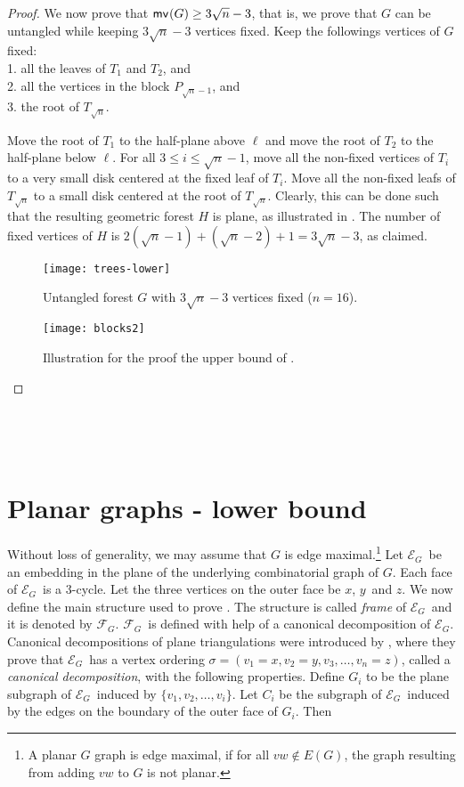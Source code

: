 \documentclass[lotsofwhite,charterfonts, letter]{patmorin}
\newcommand{\Figure}[4][htb]{
\begin{figure}[#1]
  \vspace*{1ex}
  \begin{center}#3\end{center}
	\vspace*{-2ex}
	\caption{\figlabel{#2}#4}
\end{figure}}
\newcommand{\mv}[2][]{\ensuremath{\textup{\textsf{mv}}_{#1}(#2)}}
\newcommand{\eg}{\ensuremath{\mathcal{E}_G}}
\newcommand{\fg}{\ensuremath{\mathcal{F}_G}}
\newcommand{\xx}{\ensuremath{x}}
\newcommand{\yy}{\ensuremath{y}}
\newcommand{\zz}{\ensuremath{z}}
\begin{document}
\begin{proof}



 
%


We now prove that $\mv{G}\geq 3\sqrt{n}-3$, that is, we prove that $G$ can be untangled while keeping $3\sqrt{n}-3$ vertices fixed. Keep the followings vertices of $G$ fixed:\\
1. all the leaves of $T_1$ and $T_2$, and\\
2. all the vertices in the block $P_{\sqrt{n}-1}$, and\\
3. the root of $T_{\sqrt{n}}$.

Move the root of $T_1$ to the half-plane above $\ell$ and move the root of $T_2$ to the half-plane below $\ell$. For all $3 \leq i\leq \sqrt{n}-1$, move all the non-fixed vertices of $T_i$ to a very small disk centered at the fixed leaf of $T_i$. Move all the non-fixed leafs of $T_{\sqrt{n}}$ to a small disk centered at the root of $T_{\sqrt{n}}$. Clearly, this can be done such that the resulting geometric forest $H$ is plane, as illustrated in . The number of fixed vertices of $H$ is 
$ 2(\sqrt{n}-1) + (\sqrt{n}-2) +1 = 3\sqrt{n} -3$, as claimed.

\Figure{trees-lower}{\texttt{[image: trees-lower]}
}{Untangled forest $G$ with $3\sqrt{n}-3$ vertices fixed ($n=16$).}


\Figure{blocks2}{\texttt{[image: blocks2]}
}{Illustration for the proof the upper bound of \thmref{trees-lb}.}

\end{proof}



~\newpage

~\newpage

\section{Planar graphs - lower bound}

Without loss of generality, we may assume that $G$ is edge
maximal.\footnote{A planar $G$ graph is edge maximal, if for all
$vw\not\in E(G)$, the graph resulting from adding $vw$ to $G$ is not
planar.} Let \eg\ be an embedding in the plane of the underlying
combinatorial graph of $G$. Each face of \eg\ is a $3$-cycle. Let the
three vertices on the outer face be \xx, \yy\ and \zz.  We now define
the main structure used to prove . The structure is
called \emph{frame} of \eg\ and it is denoted by \fg.  \fg\ is defined
with help of a canonical decomposition of \eg. Canonical
decompositions of plane triangulations were introduced by
\citet{dFPP90}, where they prove that
\eg\ has a vertex ordering $\sigma=(v_1=\xx,v_2=\yy, v_3, \dots,
v_n=\zz)$, called a \emph{canonical decomposition}, with the following
properties. Define $G_i$ to be the plane subgraph of \eg\ induced by
$\{v_1, v_2,\dots,v_i\}$.  Let $C_i$ be the subgraph of \eg\ induced
by the edges on the boundary of the outer face of $G_i$. Then
%
\end{document}
